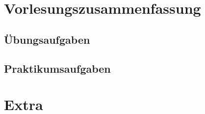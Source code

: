 \documentclass[11pt, oneside, ngerman]{report}
\begin{document}
    
    

    \clearpage
    \thispagestyle{empty}

    
    

    \clearpage
    \tableofcontents

    \clearpage

    \part{Vorlesungszusammenfassung}
    \label{part:vorlesungszusammenfassung}

    
    
    
    
    
    
    

    \chapter{Übungsaufgaben}
    \label{chap:uebungsaufgaben}

    \chapter{Praktikumsaufgaben}
    \label{chap:praktikumsaufgaben}

    \printglossary[title={Glossar}, toctitle={Glossar}]

    \clearpage
    \pagestyle{empty}
    \setcounter{page}{1}

    \part{Extra}
    \printbibliography

\end{document}
